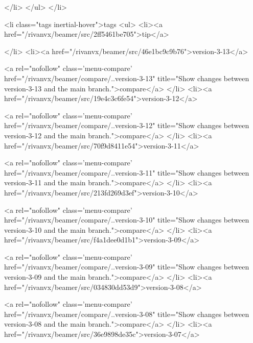             </li>
          </ul>
        </li>
      
      
      <li class="tags inertial-hover">tags
        <ul>
          <li><a href="/rivanvx/beamer/src/2ff5461be705">tip</a>
            
            </li>
          <li><a href="/rivanvx/beamer/src/46e1bc9c9b76">version-3-13</a>
            
            
              <a rel="nofollow" class='menu-compare'
                 href="/rivanvx/beamer/compare/..version-3-13"
                 title="Show changes between version-3-13 and the main branch.">compare</a>
            </li>
          <li><a href="/rivanvx/beamer/src/19e4c3c6fe54">version-3-12</a>
            
            
              <a rel="nofollow" class='menu-compare'
                 href="/rivanvx/beamer/compare/..version-3-12"
                 title="Show changes between version-3-12 and the main branch.">compare</a>
            </li>
          <li><a href="/rivanvx/beamer/src/70f9d8411e54">version-3-11</a>
            
            
              <a rel="nofollow" class='menu-compare'
                 href="/rivanvx/beamer/compare/..version-3-11"
                 title="Show changes between version-3-11 and the main branch.">compare</a>
            </li>
          <li><a href="/rivanvx/beamer/src/213fd269d3ef">version-3-10</a>
            
            
              <a rel="nofollow" class='menu-compare'
                 href="/rivanvx/beamer/compare/..version-3-10"
                 title="Show changes between version-3-10 and the main branch.">compare</a>
            </li>
          <li><a href="/rivanvx/beamer/src/f4a1dee0d1b1">version-3-09</a>
            
            
              <a rel="nofollow" class='menu-compare'
                 href="/rivanvx/beamer/compare/..version-3-09"
                 title="Show changes between version-3-09 and the main branch.">compare</a>
            </li>
          <li><a href="/rivanvx/beamer/src/034830dd53d9">version-3-08</a>
            
            
              <a rel="nofollow" class='menu-compare'
                 href="/rivanvx/beamer/compare/..version-3-08"
                 title="Show changes between version-3-08 and the main branch.">compare</a>
            </li>
          <li><a href="/rivanvx/beamer/src/36e9898de35c">version-3-07</a>
            
